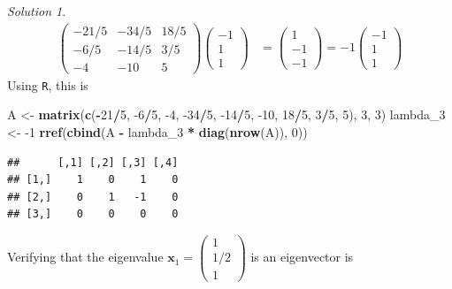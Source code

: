 \documentclass[
]{book}
\newenvironment{Shaded}{\begin{snugshade}}{\end{snugshade}}
\newcommand{\DecValTok}[1]{\textcolor[rgb]{0.00,0.00,0.81}{#1}}
\newcommand{\KeywordTok}[1]{\textcolor[rgb]{0.13,0.29,0.53}{\textbf{#1}}}
\newcommand{\NormalTok}[1]{#1}
\newcommand{\OperatorTok}[1]{\textcolor[rgb]{0.81,0.36,0.00}{\textbf{#1}}}
\newcommand{\StringTok}[1]{\textcolor[rgb]{0.31,0.60,0.02}{#1}}
\theoremstyle{definition}
\theoremstyle{definition}
\theoremstyle{definition}
\theoremstyle{definition}
\theoremstyle{remark}
\newtheorem*{solution}{Solution}
\begin{document}
\begin{solution}
\[\begin{aligned}
\begin{pmatrix} -21/5 & -34/5 & 18/5 \\ -6/5 & -14/5 & 3/5 \\ -4 & -10 & 5 \end{pmatrix} \begin{pmatrix} -1 \\ 1 \\ 1 \end{pmatrix} & = \begin{pmatrix} 1 \\ -1 \\ -1 \end{pmatrix}  = -1 \begin{pmatrix} -1 \\ 1 \\ 1 \end{pmatrix}
\end{aligned}
\]
Using \texttt{R}, this is

\begin{Shaded}
\begin{Highlighting}[]
\NormalTok{A <-}\StringTok{ }\KeywordTok{matrix}\NormalTok{(}\KeywordTok{c}\NormalTok{(}\OperatorTok{-}\DecValTok{21}\OperatorTok{/}\DecValTok{5}\NormalTok{, }\DecValTok{-6}\OperatorTok{/}\DecValTok{5}\NormalTok{, }\DecValTok{-4}\NormalTok{, }\DecValTok{-34}\OperatorTok{/}\DecValTok{5}\NormalTok{, }\DecValTok{-14}\OperatorTok{/}\DecValTok{5}\NormalTok{, }\DecValTok{-10}\NormalTok{, }\DecValTok{18}\OperatorTok{/}\DecValTok{5}\NormalTok{,  }\DecValTok{3}\OperatorTok{/}\DecValTok{5}\NormalTok{, }\DecValTok{5}\NormalTok{), }\DecValTok{3}\NormalTok{, }\DecValTok{3}\NormalTok{)}
\NormalTok{lambda_}\DecValTok{3}\NormalTok{ <-}\StringTok{ }\DecValTok{-1}
\KeywordTok{rref}\NormalTok{(}\KeywordTok{cbind}\NormalTok{(A }\OperatorTok{-}\StringTok{ }\NormalTok{lambda_}\DecValTok{3} \OperatorTok{*}\StringTok{ }\KeywordTok{diag}\NormalTok{(}\KeywordTok{nrow}\NormalTok{(A)), }\DecValTok{0}\NormalTok{))}
\end{Highlighting}
\end{Shaded}

\begin{verbatim}
##      [,1] [,2] [,3] [,4]
## [1,]    1    0    1    0
## [2,]    0    1   -1    0
## [3,]    0    0    0    0
\end{verbatim}

Verifying that the eigenvalue \(\mathbf{x}_1 = \begin{pmatrix} 1 \\ 1/2 \\ 1 \end{pmatrix}\) is an eigenvector is


\end{solution}
\end{document}
